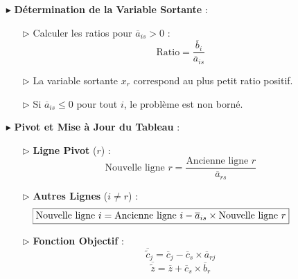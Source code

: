 \documentclass{report}
\begin{document}
\begin{multicols*}{2}
\begin{itemize}
        \item[$\blacktriangleright$] \textbf{Détermination de la Variable Sortante} :
            \begin{itemize}
                \item[$\rhd$] Calculer les ratios pour \( \overline{a}_{is} > 0 \) :
                \[%
                \boxed{\text{Ratio} = \dfrac{\overline{b}_i}{\overline{a}_{is}}}
                \]%
                \item[$\rhd$] La variable sortante \( x_r \) correspond au plus petit ratio positif.
                \item[$\rhd$] Si \( \overline{a}_{is} \leq 0 \) pour tout \( i \), le problème est non borné.
            \end{itemize}

        \item[$\blacktriangleright$] \textbf{Pivot et Mise à Jour du Tableau} :
        \begin{itemize}
            \item[$\rhd$] \textbf{Ligne Pivot} (\( r \)) :
            \[
            \boxed{\text{Nouvelle ligne } r = \dfrac{\text{Ancienne ligne } r}{\overline{a}_{rs}}}
            \]
            \item[$\rhd$] \textbf{Autres Lignes} (\( i \neq r \)) :
            \[
                \hspace{-4em}\boxed{\text{Nouvelle ligne } i = \text{Ancienne ligne } i - \overline{a}_{is} \times \text{Nouvelle ligne } r}
            \]
            \item[$\rhd$] \textbf{Fonction Objectif} :
            \[
                \boxed{\overline{\tilde{c}}_j = \overline{c}_j - \overline{c}_s \times \overline{a}_{rj}}
            \]
            \[
                \boxed{\overline{\tilde{z}} = \overline{z} + \overline{c}_s \times \overline{b}_r}
            \]
        \end{itemize}


\end{itemize}
\end{multicols*}
\end{document}
